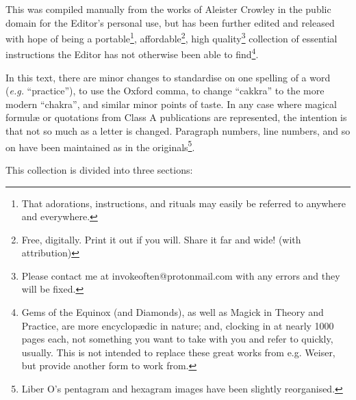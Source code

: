 This was compiled manually from the works of Aleister Crowley in the public domain for the Editor's personal use, but has been further edited and released with hope of being a portable\footnote{That adorations, instructions, and rituals may easily be referred to anywhere and everywhere.}, affordable\footnote{Free\footnotemark, digitally. Print it out if you will. Share it far and wide! (with attribution)}, high quality\footnote{Please contact me at invokeoften@protonmail.com with any errors and they will be fixed.\footnotemark} collection of essential instructions the Editor has not otherwise been able to find\footnote{Gems of the Equinox (and Diamonds), as well as Magick in Theory and Practice, are more encyclop\ae{}dic in nature; and, clocking in at nearly 1000 pages each, not something you want to take with you and refer to quickly, usually. This is not intended to replace these great works from e.g. Weiser, but provide another form to work from.}.

In this text, there are minor changes to standardise on one spelling of a word (\textit{e.g.} \enquote{practice}), to use the Oxford comma, to change \enquote{cakkra} to the more modern \enquote{chakra}, and similar minor points of taste. In any case where magical formul\ae{} or quotations from Class A publications are represented, the intention is that not so much as a letter is changed. Paragraph numbers, line numbers, and so on have been maintained as in the originals\footnote{Liber O's pentagram and hexagram images have been slightly reorganised.}.

This collection is divided into three sections:

